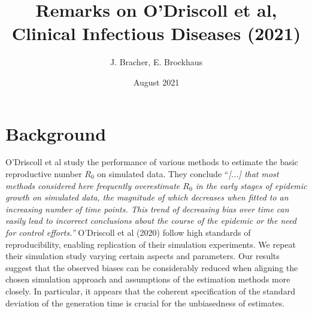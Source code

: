\documentclass{article}
\title{Remarks on O'Driscoll et al, Clinical Infectious Diseases (2021)}
\author{J. Bracher, E. Brockhaus}
\date{August 2021}
\begin{document}
\maketitle



\section{Background}

O'Driscoll et al study the performance of various methods to estimate the basic reproductive number $R_0$ on simulated data. They conclude ``\textit{[...] that most methods considered here frequently overestimate $R_0$ in the early stages of epidemic growth on simulated data, the magnitude of which decreases when fitted to an increasing number of time points. This trend of decreasing bias over time can easily lead to incorrect conclusions about the course of the epidemic or the need for control efforts.''} O'Driscoll et al (2020) follow high standards of reproducibility, enabling replication of their simulation experiments. We repeat their simulation study varying certain aspects and parameters. Our results suggest that the observed biases can be considerably reduced when aligning the chosen simulation approach and assumptions of the estimation methods more closely. In particular, it appears that the coherent specification of the standard deviation of the generation time is crucial for the unbiasedness of estimates.

\end{document}
